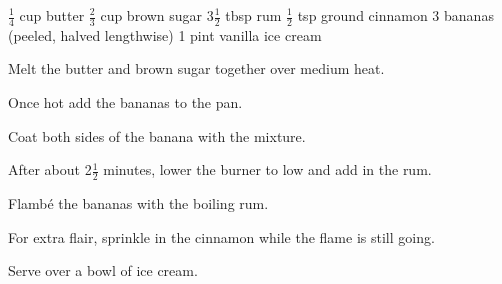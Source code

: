 \dishtype{\dessert}
\dishother{\vegetarian}
\begin{ingreds}
    $\frac{1}{4}$ cup butter
    $\frac{2}{3}$ cup brown sugar
    3$\frac{1}{2}$ tbsp rum
    $\frac{1}{2}$ tsp ground cinnamon
    3 bananas (peeled, halved lengthwise)
    1 pint vanilla ice cream
\end{ingreds}
\begin{method}
    Melt the butter and brown sugar together over medium heat.\par
    Once hot add the bananas to the pan.\par
    Coat both sides of the banana with the mixture.\par
    After about 2$\frac{1}{2}$ minutes, lower the burner to low and add in the rum.\par
    Flamb\'e the bananas with the boiling rum.\par
    For extra flair, sprinkle in the cinnamon while the flame is still going.\par
    Serve over a bowl of ice cream.
\end{method}